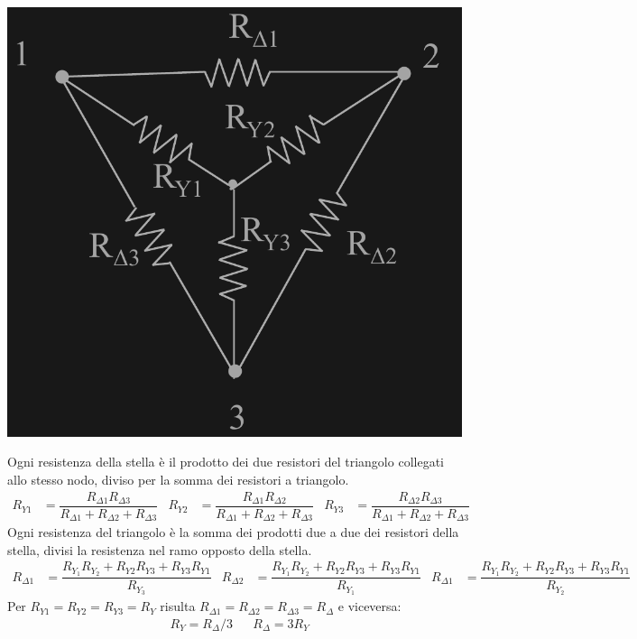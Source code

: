 \documentclass{article}
\begin{document}
\begin{center}
    \includegraphics[scale=0.23]{Image/Stella triangolo insieme.png}
\end{center}
Ogni resistenza della stella è il prodotto dei due
resistori del triangolo collegati allo stesso nodo,
diviso per la somma dei resistori a triangolo.
\begin{align*}
    R_{Y1} &= \dfrac{R_{\Delta 1} R_{\Delta 3}}{R_{\Delta 1} + R_{\Delta 2} + R_{\Delta 3}} &
    R_{Y2} &= \dfrac{R_{\Delta 1} R_{\Delta 2}}{R_{\Delta 1} + R_{\Delta 2} + R_{\Delta 3}} &
    R_{Y3} &= \dfrac{R_{\Delta 2} R_{\Delta 3}}{R_{\Delta 1} + R_{\Delta 2} + R_{\Delta 3}}
\end{align*}
Ogni resistenza del triangolo è la somma dei prodotti due a due dei
resistori della stella, divisi la resistenza nel ramo opposto della stella.
\begin{align*}
    R_{\Delta 1} &= \dfrac{R_{Y_1}R_{Y_2} +R_{Y2}R_{Y3} + R_{Y3}R_{Y1}}{R_{Y_3}} &
    R_{\Delta 2} &= \dfrac{R_{Y_1}R_{Y_2} +R_{Y2}R_{Y3} + R_{Y3}R_{Y1}}{R_{Y_1}} &
    R_{\Delta 1} &= \dfrac{R_{Y_1}R_{Y_2} +R_{Y2}R_{Y3} + R_{Y3}R_{Y1}}{R_{Y_2}}
\end{align*}
Per $R_{Y1} = R_{Y2} = R_{Y3} = R_Y$ risulta $R_{\Delta 1} = R_{\Delta 2} = R_{\Delta 3} = R_{\Delta}$ e viceversa:
\begin{align*}
    &R_Y = R_{\Delta}/3
    &
    &R_{\Delta} = 3R_Y
\end{align*}
\end{document}
